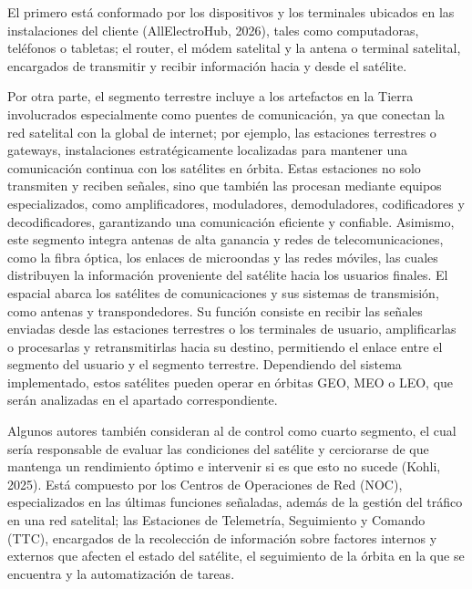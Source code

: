 El primero está conformado por los dispositivos y los terminales ubicados en las instalaciones del cliente (AllElectroHub, 2026), tales como computadoras, teléfonos o tabletas; el router, el módem satelital y la antena o terminal satelital, encargados de transmitir y recibir información hacia  y desde el satélite. 

Por otra parte, el segmento terrestre incluye a los artefactos en la Tierra involucrados especialmente como puentes de comunicación, ya que conectan la red satelital con la global de internet; por ejemplo, las estaciones terrestres o gateways, instalaciones estratégicamente localizadas para mantener una comunicación continua con los satélites en órbita. Estas estaciones no solo transmiten y reciben señales, sino que también las procesan mediante equipos especializados, como amplificadores, moduladores, demoduladores, codificadores y decodificadores, garantizando una comunicación eficiente y confiable. Asimismo, este segmento integra antenas de alta ganancia y redes de telecomunicaciones, como la fibra óptica, los enlaces de microondas y las redes móviles, las cuales distribuyen la información proveniente del satélite hacia los usuarios finales. 
El espacial abarca los satélites de comunicaciones y sus sistemas de transmisión, como antenas y transpondedores. Su función consiste en recibir las señales enviadas desde las estaciones terrestres o los terminales de usuario, amplificarlas o procesarlas y retransmitirlas hacia su destino, permitiendo el enlace entre el segmento del usuario y el segmento terrestre. Dependiendo del sistema implementado, estos satélites pueden operar en órbitas GEO, MEO o LEO, que serán analizadas en el apartado correspondiente. 


Algunos autores también consideran al de control como cuarto segmento, el cual sería responsable de evaluar las condiciones del satélite y cerciorarse de que mantenga un rendimiento óptimo e intervenir si es que esto no sucede (Kohli, 2025). Está compuesto por los Centros de Operaciones de Red (NOC), especializados en las últimas funciones señaladas, además de la gestión del tráfico en una red satelital; las Estaciones de Telemetría, Seguimiento y Comando (TTC), encargados de la recolección de información sobre factores internos y externos que afecten el estado del satélite, el seguimiento de la órbita en la que se encuentra y la automatización de tareas. 

